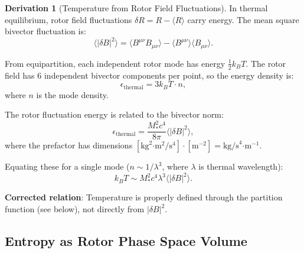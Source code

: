 \documentclass[12pt,a4paper]{article}
\theoremstyle{definition}
\newtheorem{derivation}{Derivation}[section]
\theoremstyle{remark}
\begin{document}
\begin{derivation}[Temperature from Rotor Field Fluctuations]

In thermal equilibrium, rotor field fluctuations $\delta R = R - \langle R \rangle$ carry energy. The mean square bivector fluctuation is:
\begin{equation}
\langle |\delta B|^2 \rangle = \langle B^{\mu\nu} B_{\mu\nu} \rangle - \langle B^{\mu\nu} \rangle \langle B_{\mu\nu} \rangle.
\end{equation}

From equipartition, each independent rotor mode has energy $\frac{1}{2}k_B T$. The rotor field has 6 independent bivector components per point, so the energy density is:
\begin{equation}
\epsilon_{\text{thermal}} = 3 k_B T \cdot n,
\end{equation}
where $n$ is the mode density.

The rotor fluctuation energy is related to the bivector norm:
\begin{equation}
\epsilon_{\text{thermal}} = \frac{M_*^2 c^4}{8\pi} \langle |\delta B|^2 \rangle,
\end{equation}
where the prefactor has dimensions $[\text{kg}^2\text{·m}^2/\text{s}^4] \cdot [\text{m}^{-2}] = \text{kg/s}^4\text{·m}^{-1}$.

Equating these for a single mode ($n \sim 1/\lambda^3$, where $\lambda$ is thermal wavelength):
\begin{equation}
k_B T \sim M_*^2 c^4 \lambda^3 \langle |\delta B|^2 \rangle.
\end{equation}

\textbf{Corrected relation}: Temperature is properly defined through the partition function (see below), not directly from $|\delta B|^2$.
\end{derivation}

\subsection{Entropy as Rotor Phase Space Volume}
\end{document}
